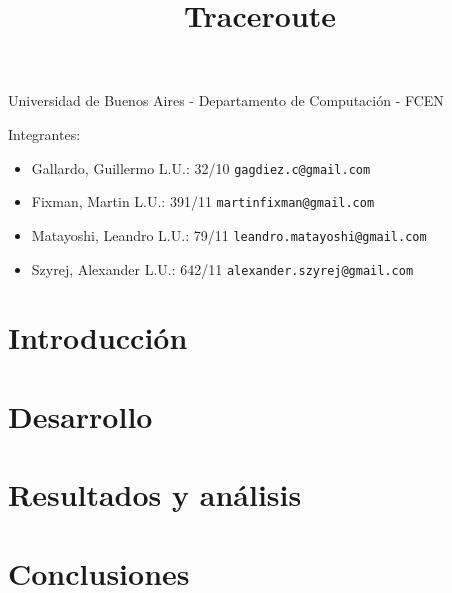 \documentclass[a4paper,11pt]{article}
\title{Traceroute}
\begin{document}
\maketitle

\begin{center}
	Universidad de Buenos Aires - Departamento de Computaci\'on - FCEN
\end{center}

\vspace{2cm}
Integrantes:

\begin{itemize}
	\item Gallardo, Guillermo L.U.: 32/10 \verb+gagdiez.c@gmail.com+
	\item Fixman, Martin L.U.: 391/11 \verb+martinfixman@gmail.com+
	\item Matayoshi, Leandro L.U.: 79/11 \verb+leandro.matayoshi@gmail.com+
	\item Szyrej, Alexander L.U.: 642/11 \verb+alexander.szyrej@gmail.com+
		
\end{itemize}

\newpage

\tableofcontents

\newpage

\section{Introducción}



\section{Desarrollo}

%

\clearpage

\section{Resultados y análisis}

%

\section{Conclusiones}

%
\end{document}
